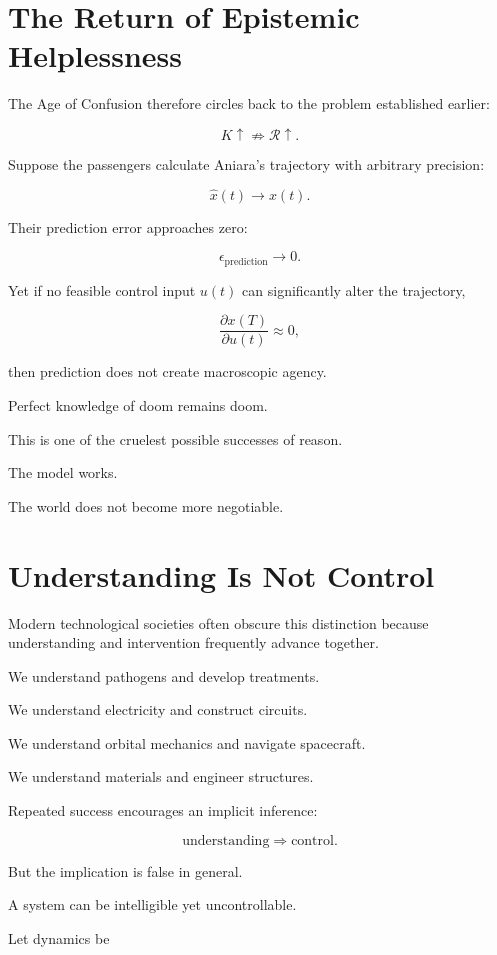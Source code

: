 \documentclass[11pt,oneside]{book}
\theoremstyle{definition}
\theoremstyle{remark}
\newcommand{\R}{\mathcal{R}}
\begin{document}
\section{The Return of Epistemic Helplessness}

The Age of Confusion therefore circles back to the problem established earlier:

\[
K\uparrow
\not\Rightarrow
\R\uparrow.
\]

Suppose the passengers calculate Aniara's trajectory with arbitrary precision:

\[
\hat{x}(t)
\rightarrow
x(t).
\]

Their prediction error approaches zero:

\[
\epsilon_{\mathrm{prediction}}
\rightarrow0.
\]

Yet if no feasible control input \(u(t)\) can significantly alter the trajectory,

\[
\frac{\partial x(T)}
{\partial u(t)}
\approx0,
\]

then prediction does not create macroscopic agency.

Perfect knowledge of doom remains doom.

This is one of the cruelest possible successes of reason.

The model works.

The world does not become more negotiable.

\section{Understanding Is Not Control}

Modern technological societies often obscure this distinction because understanding and intervention frequently advance together.

We understand pathogens and develop treatments.

We understand electricity and construct circuits.

We understand orbital mechanics and navigate spacecraft.

We understand materials and engineer structures.

Repeated success encourages an implicit inference:

\[
\text{understanding}
\Rightarrow
\text{control}.
\]

But the implication is false in general.

A system can be intelligible yet uncontrollable.

Let dynamics be
\end{document}
